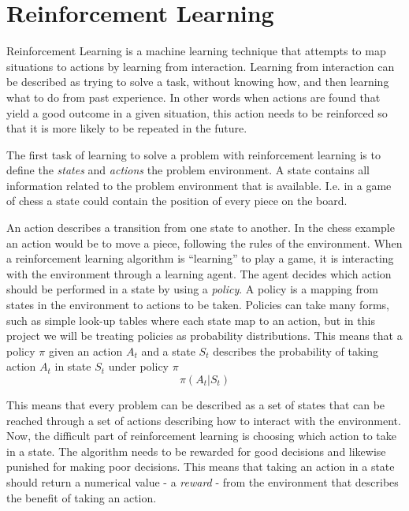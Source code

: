 \documentclass[11pt]{article}
\begin{document}
\maketitle

\section{Reinforcement Learning}

Reinforcement Learning is a machine learning technique that attempts 
to map situations to actions by learning from interaction.
Learning from interaction can be described as trying to solve a task, without knowing
how, and then learning what to do from past experience.
In other words when actions are found that yield a good outcome in a given situation,
this action needs to be reinforced so that it is more likely to be repeated in the
future.

The first task of learning to solve a problem with reinforcement learning is to define
the \textit{states} and \textit{actions} the problem environment.
A state contains all information related to the problem environment that is available.
I.e. in a game of chess a state could contain the position of every piece on the board.

An action describes a transition from one state to another.
In the chess example an action would be to move a piece, following the rules of the
environment.
When a reinforcement learning algorithm is “learning” to play a game, it is
interacting with the environment through a learning agent.
The agent decides which action should be performed in a state by using a \textit{policy}.
A policy is a mapping from states in the environment to actions to be taken\cite{RLBook}.
Policies can take many forms, such as simple look-up tables where each state map to an
action, but in this project we will be treating policies as probability distributions.
This means that a policy $\pi$ given an action $A_t$ and a state $S_t$ describes the
probability of taking action $A_t$ in state $S_t$ under policy $\pi$
\begin{equation}\label{pi}
    \pi(A_t|S_t)
\end{equation}

This means that every problem can be described as a set of states that can be reached
through a set of actions describing how to interact with the environment.
Now, the difficult part of reinforcement learning is choosing which action to take
in a state.
The algorithm needs to be rewarded for good decisions and likewise punished for making
poor decisions.
This means that taking an action in a state should return a numerical value
- a \textit{reward} - from the environment that describes the benefit of taking an
action.
\end{document}
